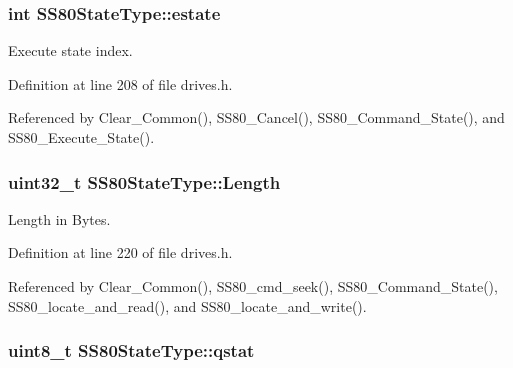 \subsubsection[{\texorpdfstring{estate}{estate}}]{\setlength{\rightskip}{0pt plus 5cm}int S\+S80\+State\+Type\+::estate}\hypertarget{structSS80StateType_ae4a94143cb4201687be4e33684be057e}{}\label{structSS80StateType_ae4a94143cb4201687be4e33684be057e}


Execute state index. 



Definition at line 208 of file drives.\+h.



Referenced by Clear\+\_\+\+Common(), S\+S80\+\_\+\+Cancel(), S\+S80\+\_\+\+Command\+\_\+\+State(), and S\+S80\+\_\+\+Execute\+\_\+\+State().

\subsubsection[{\texorpdfstring{Length}{Length}}]{\setlength{\rightskip}{0pt plus 5cm}uint32\+\_\+t S\+S80\+State\+Type\+::\+Length}\hypertarget{structSS80StateType_a507159f0a0a4f3127488081fd618e8f6}{}\label{structSS80StateType_a507159f0a0a4f3127488081fd618e8f6}


Length in Bytes. 



Definition at line 220 of file drives.\+h.



Referenced by Clear\+\_\+\+Common(), S\+S80\+\_\+cmd\+\_\+seek(), S\+S80\+\_\+\+Command\+\_\+\+State(), S\+S80\+\_\+locate\+\_\+and\+\_\+read(), and S\+S80\+\_\+locate\+\_\+and\+\_\+write().

\subsubsection[{\texorpdfstring{qstat}{qstat}}]{\setlength{\rightskip}{0pt plus 5cm}uint8\+\_\+t S\+S80\+State\+Type\+::qstat}\hypertarget{structSS80StateType_ad4911c7b89ec1ff2c0aa01881b1e3d3a}{}\label{structSS80StateType_ad4911c7b89ec1ff2c0aa01881b1e3d3a}


